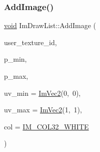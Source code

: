 \mbox{\label{structImDrawList_ac1f529d53d7ba118484e47e49218c603}} 
\subsubsection{\texorpdfstring{Add\+Image()}{AddImage()}}
{\footnotesize\ttfamily \hyperlink{imgui__impl__opengl3__loader_8h_ac668e7cffd9e2e9cfee428b9b2f34fa7}{void} Im\+Draw\+List\+::\+Add\+Image (\begin{DoxyParamCaption}\item[{Im\+Texture\+ID}]{user\+\_\+texture\+\_\+id,  }\item[{const \hyperlink{structImVec2}{Im\+Vec2} \&}]{p\+\_\+min,  }\item[{const \hyperlink{structImVec2}{Im\+Vec2} \&}]{p\+\_\+max,  }\item[{const \hyperlink{structImVec2}{Im\+Vec2} \&}]{uv\+\_\+min = {\ttfamily \hyperlink{structImVec2}{Im\+Vec2}(0,~0)},  }\item[{const \hyperlink{structImVec2}{Im\+Vec2} \&}]{uv\+\_\+max = {\ttfamily \hyperlink{structImVec2}{Im\+Vec2}(1,~1)},  }\item[{Im\+U32}]{col = {\ttfamily \hyperlink{imgui_8h_a08fc9855cd3e3fcbb7fcd93b38bd7057}{I\+M\+\_\+\+C\+O\+L32\+\_\+\+W\+H\+I\+TE}} }\end{DoxyParamCaption})}

\mbox{\label{structImDrawList_abf9199e08d17fd33736fd67598485341}} 
